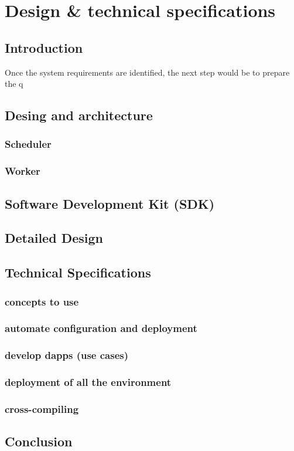

\chapter{Design \& technical specifications}


\section{Introduction}
    Once the system requirements are identified, the next step would be to prepare the q

\section{Desing and architecture}
    \subsection{Scheduler}
    \subsection{Worker}

\section{Software Development Kit (SDK)}


\section{Detailed Design}


\section{Technical Specifications}
    \subsection{concepts to use}
    \subsection{automate configuration and deployment}
    \subsection{develop dapps (use cases)}
    \subsection{deployment of all the environment}
    \subsection{cross-compiling}


\section{Conclusion}